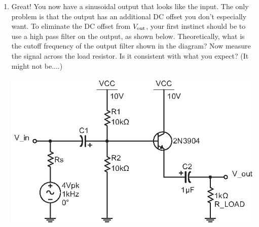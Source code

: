 \begin{enumerate}[wide]
\pagebreak[3]
\item Great!  You now have a sinusoidal output that looks like the input.  The only problem is that the output has an additional DC offset you don't especially want.  To eliminate the DC offset from $V_{\rm out}$, your first instinct should be to use a high pass filter on the output, as shown below.  Theoretically, what is the cutoff frequency of the output filter shown in the diagram?  Now measure the signal across the load resistor.  Is it consistent with what you expect?  (It might not be....)
\begin{center}
\vspace{-0.08in}
\includegraphics{bjt/biased_output_and_input_incorrect.eps}
\vspace{-0.08in}
\end{center}


\end{enumerate}
